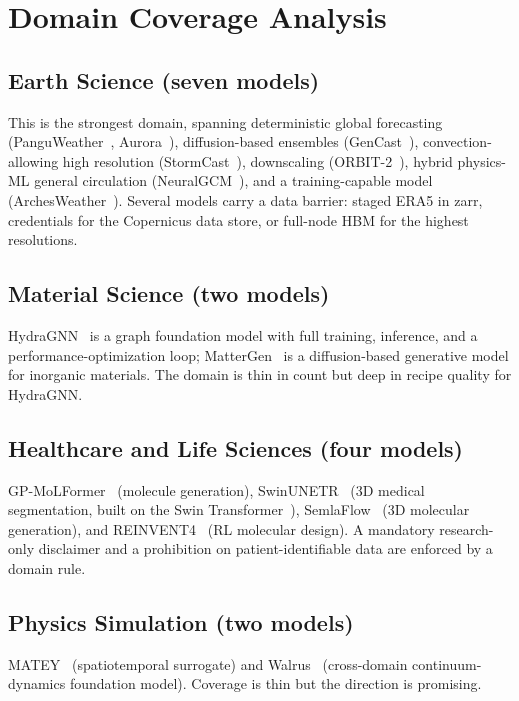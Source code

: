 \documentclass[11pt]{article}
\begin{document}
\section{Domain Coverage Analysis}
\label{sec:domains}

\subsection{Earth Science (seven models)}
This is the strongest domain, spanning deterministic global forecasting
(PanguWeather~\cite{bi2023panguweather}, Aurora~\cite{bodnar2025aurora}),
diffusion-based ensembles (GenCast~\cite{price2025gencast}), convection-allowing
high resolution (StormCast~\cite{bodnar2024stormcast}), downscaling
(ORBIT-2~\cite{wang2025orbit2}), hybrid physics-ML general circulation
(NeuralGCM~\cite{kochkov2023neuralgcm}), and a training-capable model
(ArchesWeather~\cite{couairon2024archesweather}). Several models carry a data
barrier: staged ERA5 in zarr, credentials for the Copernicus data store, or
full-node HBM for the highest resolutions.

\subsection{Material Science (two models)}
HydraGNN~\cite{lupopasini2024hydragnn} is a graph foundation model with full
training, inference, and a performance-optimization loop; MatterGen~\cite{zeni2025mattergen}
is a diffusion-based generative model for inorganic materials. The domain is thin in
count but deep in recipe quality for HydraGNN.

\subsection{Healthcare and Life Sciences (four models)}
GP-MoLFormer~\cite{ross2023gpmolformer} (molecule generation),
SwinUNETR~\cite{hatamizadeh2022swinunetr} (3D medical segmentation, built on the
Swin Transformer~\cite{liu2021swin}), SemlaFlow~\cite{morehead2024semlaflow} (3D
molecular generation), and REINVENT4~\cite{loeffler2024reinvent4} (RL molecular
design). A mandatory research-only disclaimer and a prohibition on
patient-identifiable data are enforced by a domain rule.

\subsection{Physics Simulation (two models)}
MATEY~\cite{subramanian2024matey} (spatiotemporal surrogate) and
Walrus~\cite{mccabe2025walrus} (cross-domain continuum-dynamics foundation model).
Coverage is thin but the direction is promising.
\end{document}
